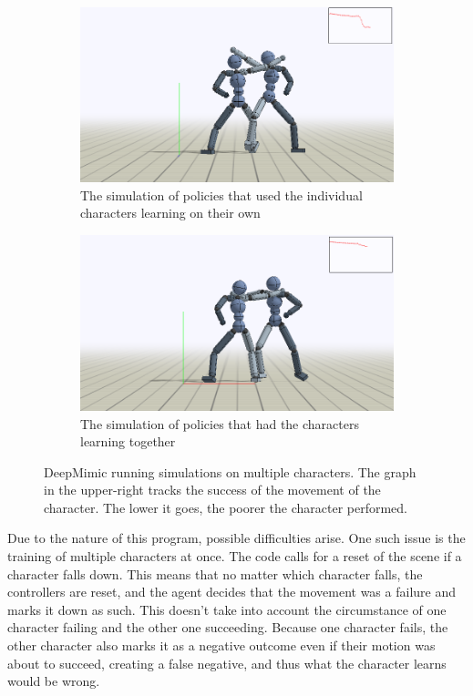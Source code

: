 \documentclass{l4proj}
\begin{document}
\begin{figure}
  \begin{subfigure}[b]{0.45\textwidth}
    \includegraphics[width=\textwidth]{images/interaction_fail.png}
    \caption{The simulation of policies that used the individual characters learning on their own}
    \label{fig:interactionfail}
  \end{subfigure}
  \begin{subfigure}[b]{0.45\textwidth}
    \includegraphics[width=\textwidth]{images/interaction.png}
    \caption{The simulation of policies that had the characters learning together}
    \label{fig:interactionsucceed}
  \end{subfigure}
  \caption{DeepMimic running simulations on multiple characters. The graph in the upper-right tracks the success of the movement of the character. The lower it goes, the poorer the character performed.}
  \label{fig:picturedinteraction}
\end{figure}

Due to the nature of this program, possible difficulties arise. One such issue is the training of multiple characters at once. The code calls for a reset of the scene if a character falls down. This means that no matter which character falls, the controllers are reset, and the agent decides that the movement was a failure and marks it down as such. This doesn't take into account the circumstance of one character failing and the other one succeeding. Because one character fails, the other character also marks it as a negative outcome even if their motion was about to succeed, creating a false negative, and thus what the character learns would be wrong.
\end{document}

